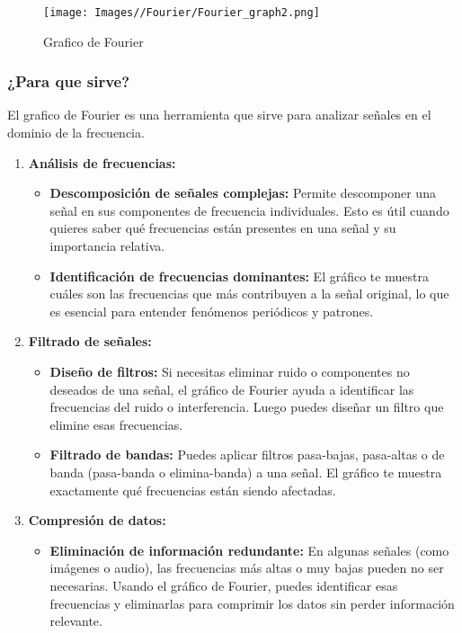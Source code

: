 \documentclass{article}
\begin{document}
\begin{figure}[H]
    \centering
    \texttt{[image: Images//Fourier/Fourier\_graph2.png]}
    \caption{Grafico de Fourier}
    \label{fig:enter-label}
\end{figure}

\subsubsection{¿Para que sirve?}
El grafico de Fourier es una herramienta que sirve para analizar señales en el dominio de la frecuencia.
\newpage
\begin{enumerate}
    \item \textbf{Análisis de frecuencias:}
    \begin{itemize}
        \item \textbf{Descomposición de señales complejas:} Permite descomponer una señal en sus componentes de frecuencia individuales. Esto es útil cuando quieres saber qué frecuencias están presentes en una señal y su importancia relativa.
    
        \item \textbf{Identificación de frecuencias dominantes:} El gráfico te muestra cuáles son las frecuencias que más contribuyen a la señal original, lo que es esencial para entender fenómenos periódicos y patrones.
    \end{itemize}
    \item \textbf{Filtrado de señales:}
    \begin{itemize}
        \item \textbf{Diseño de filtros:} Si necesitas eliminar ruido o componentes no deseados de una señal, el gráfico de Fourier ayuda a identificar las frecuencias del ruido o interferencia. Luego puedes diseñar un filtro que elimine esas frecuencias.
    
        \item \textbf{Filtrado de bandas:} Puedes aplicar filtros pasa-bajas, pasa-altas o de banda (pasa-banda o elimina-banda) a una señal. El gráfico te muestra exactamente qué frecuencias están siendo afectadas.
    \end{itemize}
    
    \item \textbf{Compresión de datos:}
    \begin{itemize}
        \item \textbf{ Eliminación de información redundante:} En algunas señales (como imágenes o audio), las frecuencias más altas o muy bajas pueden no ser necesarias. Usando el gráfico de Fourier, puedes identificar esas frecuencias y eliminarlas para comprimir los datos sin perder información relevante.
    

\end{itemize}
\end{enumerate}
\end{document}
